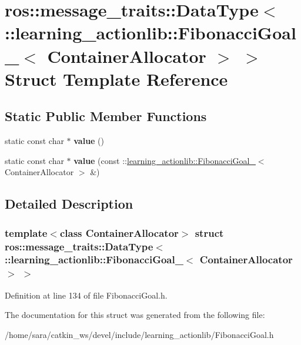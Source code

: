 \hypertarget{structros_1_1message__traits_1_1DataType_3_01_1_1learning__actionlib_1_1FibonacciGoal___3_01ContainerAllocator_01_4_01_4}{}\section{ros\+:\+:message\+\_\+traits\+:\+:Data\+Type$<$ \+:\+:learning\+\_\+actionlib\+:\+:Fibonacci\+Goal\+\_\+$<$ Container\+Allocator $>$ $>$ Struct Template Reference}
\label{structros_1_1message__traits_1_1DataType_3_01_1_1learning__actionlib_1_1FibonacciGoal___3_01ContainerAllocator_01_4_01_4}
\subsection*{Static Public Member Functions}
\begin{DoxyCompactItemize}
\item 
\mbox{\label{structros_1_1message__traits_1_1DataType_3_01_1_1learning__actionlib_1_1FibonacciGoal___3_01ContainerAllocator_01_4_01_4_ae3a80e5265182b28595238e0dbd0747e}} 
static const char $\ast$ {\bfseries value} ()
\item 
\mbox{\label{structros_1_1message__traits_1_1DataType_3_01_1_1learning__actionlib_1_1FibonacciGoal___3_01ContainerAllocator_01_4_01_4_ae69bf9cdfaa9d9e67224b10fe484923b}} 
static const char $\ast$ {\bfseries value} (const \+::\hyperlink{structlearning__actionlib_1_1FibonacciGoal__}{learning\+\_\+actionlib\+::\+Fibonacci\+Goal\+\_\+}$<$ Container\+Allocator $>$ \&)
\end{DoxyCompactItemize}


\subsection{Detailed Description}
\subsubsection*{template$<$class Container\+Allocator$>$\newline
struct ros\+::message\+\_\+traits\+::\+Data\+Type$<$ \+::learning\+\_\+actionlib\+::\+Fibonacci\+Goal\+\_\+$<$ Container\+Allocator $>$ $>$}



Definition at line 134 of file Fibonacci\+Goal.\+h.



The documentation for this struct was generated from the following file\+:\begin{DoxyCompactItemize}
\item 
/home/sara/catkin\+\_\+ws/devel/include/learning\+\_\+actionlib/Fibonacci\+Goal.\+h\end{DoxyCompactItemize}
